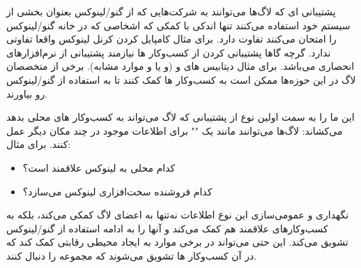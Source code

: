 پشتیبانی ای که لاگ‌ها می‌توانند به شرکت‌هایی که از گنو/لینوکس
بعنوان بخشی از سیستم خود استفاده می‌کنند تنها اندکی با کمکی
که اشخاصی که در خانه گنو/لینوکس را امتحان می‌کنند تفاوت دارد.
برای مثال کامپایل کردن کرنل لینوکس واقعا تفاوتی ندارد.
گرچه گاها پشتیبانی کردن از کسب‌وکار ها نیازمند پشتیبانی از
نرم‌افزارهای انحصاری می‌باشد. برای مثال دیتابیس های
 و 
(و یا
و موارد مشابه).
برخی از متخصصان لاگ در این حوزه‌ها ممکن است به کسب‌وکار ها کمک کنند
تا به استفاده از گنو/لینوکس رو بیاورند.

این ما را به سمت اولین نوع از پشتیبانی که لاگ می‌تواند به
کسب‌وکار های محلی بدهد می‌کشاند: لاگ‌ها می‌توانند مانند یک
""
برای اطلاعات موجود در چند مکان دیگر عمل کنند. برای مثال:

\begin{itemize}
\item
کدام  محلی به لینوکس علاقمند است؟
\item
کدام فروشنده سخت‌افزاری  لینوکس می‌سازد؟
\end{itemize}


نگهداری و عمومی‌سازی این نوع اطلاعات نه‌تنها به اعضای لاگ کمکی می‌کند،
بلکه به کسب‌وکارهای علاقمند هم کمک می‌کند و آنها را به ادامه استفاده از
گنو/لینوکس تشویق می‌کند.
این حتی می‌تواند در برخی موارد به ایجاد محیطی رقابتی کمک کند که
در آن کسب‌وکار ها تشویق می‌شوند که مجموعه را دنبال کنند.

